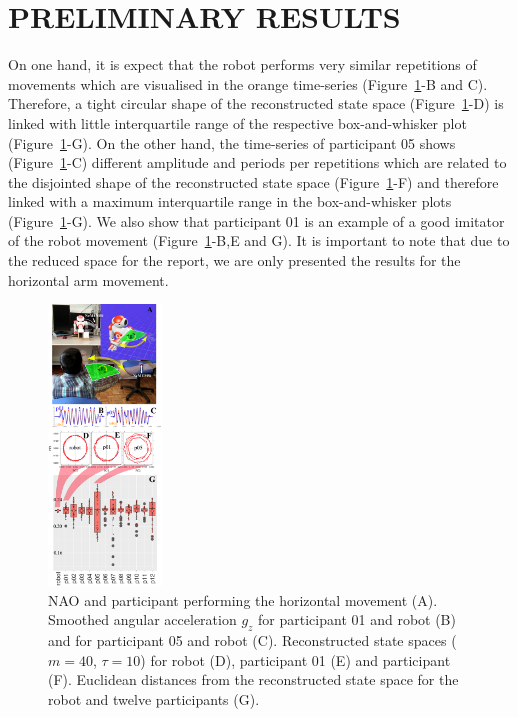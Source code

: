 \documentclass{sig-alternate-05-2015}
\begin{document}
\section{PRELIMINARY RESULTS}

On one hand, it is expect that the robot performs very similar repetitions of movements 
which are visualised in the orange time-series (Figure~\ref{fig:main}-B and C). 
Therefore, a tight circular  shape of the reconstructed state space (Figure~\ref{fig:main}-D)
is linked with little interquartile range of the respective box-and-whisker plot  (Figure~\ref{fig:main}-G).
On the other hand, 
the time-series of participant 05 shows (Figure~\ref{fig:main}-C)
 different amplitude and periods per repetitions which
are related to the disjointed shape of 
the reconstructed state space (Figure~\ref{fig:main}-F) and therefore 
linked with a maximum interquartile range in the  box-and-whisker plots  (Figure~\ref{fig:main}-G).
We also show that participant 01 is an example of a good imitator of the robot movement
(Figure~\ref{fig:main}-B,E and G).
It is important to note that due to the reduced space for the report, we are only presented
the results for the horizontal arm movement.





\begin{figure}[ht]
\centering
\includegraphics[width=0.27\textwidth]{fig06}
\caption{
NAO and participant performing the horizontal movement (A). 
Smoothed angular acceleration $g_z$ for participant 01  and robot (B)
and for participant 05 and robot (C).
Reconstructed state spaces  ($m=40$, $\tau=10$) for robot (D), participant 01 (E) and participant (F).
Euclidean distances from the reconstructed state space for the robot and twelve participants (G).
}
\label{fig:main}
\end{figure}
\end{document}
